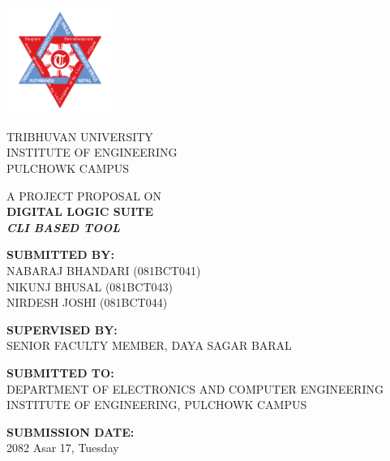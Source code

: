 \begin{titlepage}
    \begin{center}
        \includegraphics[width=3.5cm]{images/tuLogo.png}
        \vspace{0.8cm}

        {\large TRIBHUVAN UNIVERSITY} \\
        {\normalsize INSTITUTE OF ENGINEERING} \\
        {\normalsize PULCHOWK CAMPUS}
        \vspace{1cm}

        {\large A PROJECT PROPOSAL ON} \\
        \vspace{0.4cm}
        {\LARGE \textbf{DIGITAL LOGIC SUITE}} \\
        \vspace{0.2cm}
        {\normalsize \textit{\textbf{CLI BASED TOOL}}}
        \vspace{1cm}

        {\normalsize \textbf{SUBMITTED BY:}} \\
        \vspace{0.2cm}
        {\normalsize NABARAJ BHANDARI (081BCT041)} \\
        {\normalsize NIKUNJ BHUSAL (081BCT043)} \\
        {\normalsize NIRDESH JOSHI (081BCT044)}
        \vspace{0.8cm}

        {\normalsize \textbf{SUPERVISED BY:}} \\
        \vspace{0.2cm}
        {\normalsize SENIOR FACULTY MEMBER, DAYA SAGAR BARAL}
        \vspace{0.8cm}

        {\normalsize \textbf{SUBMITTED TO:}} \\
        \vspace{0.2cm}
        {\normalsize DEPARTMENT OF ELECTRONICS AND COMPUTER ENGINEERING} \\
        {\normalsize INSTITUTE OF ENGINEERING, PULCHOWK CAMPUS}
        \vspace{1cm}

        {\normalsize \textbf{SUBMISSION DATE:}} \\
        \vspace{0.2cm}
        {\normalsize 2082 Asar 17, Tuesday}
    \end{center}
\end{titlepage}